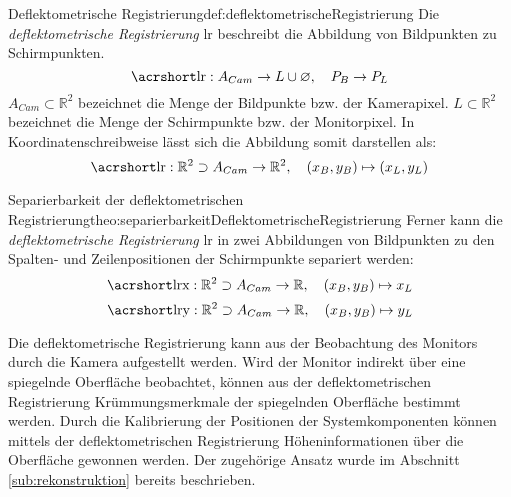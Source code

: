 \begin{Definition}{Deflektometrische Registrierung}{def:deflektometrischeRegistrierung}
	Die \textit{deflektometrische Registrierung} \acrshort{lr} beschreibt die Abbildung von Bildpunkten zu Schirmpunkten. \cite{kit_werling}
	\begin{equation*}
		\acrshortmath{lr} : A_{Cam} \rightarrow L \cup \varnothing ,\quad P_{B} \rightarrow P_{L}
	\end{equation*}
	$ A_{Cam} \subset \mathbb{R}^{2} $ bezeichnet die Menge der Bildpunkte bzw. der Kamerapixel.
	$ L \subset \mathbb{R}^{2} $ bezeichnet die Menge der Schirmpunkte bzw. der Monitorpixel.
	In Koordinatenschreibweise lässt sich die Abbildung somit darstellen als:
	\begin{equation*}\label{eq:deflektometrischeRegistrierungAbbildung}
		\acrshortmath{lr} : \mathbb{R}^{2} \supset A_{Cam} \rightarrow \mathbb{R}^2 ,\quad (x_{B}, y_{B}) \mapsto (x_{L}, y_{L})
	\end{equation*}
\end{Definition}

\begin{Satz}{Separierbarkeit der deflektometrischen Registrierung}{theo:separierbarkeitDeflektometrischeRegistrierung}
Ferner kann die \textit{deflektometrische Registrierung} \acrshort{lr} in zwei Abbildungen von Bildpunkten zu den Spalten- und Zeilenpositionen der Schirmpunkte separiert werden:
	\begin{equation*}
		\acrshortmath{lrx} : \mathbb{R}^{2} \supset A_{Cam} \rightarrow \mathbb{R} ,\quad (x_{B}, y_{B}) \mapsto x_{L}
	\end{equation*}
	\begin{equation*}
		\acrshortmath{lry} : \mathbb{R}^{2} \supset A_{Cam} \rightarrow \mathbb{R} ,\quad (x_{B}, y_{B}) \mapsto y_{L}
	\end{equation*}
\end{Satz}

\noindent
Die deflektometrische Registrierung kann aus der Beobachtung des Monitors durch die Kamera aufgestellt werden.
Wird der Monitor indirekt über eine spiegelnde Oberfläche beobachtet, können aus der deflektometrischen Registrierung Krümmungsmerkmale der spiegelnden Oberfläche bestimmt werden.
Durch die Kalibrierung der Positionen der Systemkomponenten können mittels der deflektometrischen Registrierung Höheninformationen über die Oberfläche gewonnen werden.
Der zugehörige Ansatz wurde im Abschnitt \ref{sub:rekonstruktion} bereits beschrieben.

